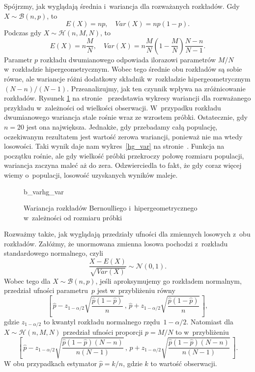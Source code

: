 Spójrzmy, jak wyglądają średnia i~wariancja dla rozważanych rozkładów.
Gdy $X\sim\mathcal{B}(n,p)$, to
\begin{equation}
E(X)=np,\quad Var(X)=np(1-p).
\end{equation}
Podczas gdy $X\sim\mathcal{H}(n,M,N)$, to
\begin{equation}
E(X)=n\frac{M}{N},\quad Var(X)=n\frac{M}{N}\left(1-\frac{M}{N}\right)\frac{N-n}{N-1}.
\end{equation}
Parametr $p$ rozkładu dwumianowego odpowiada ilorazowi parametrów $M/N$ w~rozkładzie hipergeometrycznym. Wobec tego średnie obu rozkładów są sobie równe, ale wariancje różni dodatkowy składnik w~rozkładzie hipergeometrycznym $(N-n)/(N-1)$. Przeanalizujmy, jak ten czynnik wpływa na zróżnicowanie rozkładów. Rysunek \ref{var} na stronie~\pageref{var} przedstawia wykresy wariancji dla rozważanego przykładu w~zależności od wielkości obserwacji. W~przypadku rozkładu dwumianowego wariancja stale rośnie wraz ze wzrostem próbki. Ostatecznie, gdy $n=20$ jest ona największa. Jednakże, gdy przebadamy całą populację, oczekiwanym rezultatem jest wartość zerowa wariancji, ponieważ nie ma wtedy losowości. Taki wynik daje nam wykres~\ref{hg_var} na stronie~\pageref{hg_var}. Funkcja na początku rośnie, ale gdy wielkość próbki przekroczy połowę rozmiaru populacji, wariancja zaczyna maleć aż do zera. Odzwierciedla to fakt, że gdy coraz więcej wiemy o~populacji, losowość uzyskanych wyników maleje.


\begin{figure}[h]
	\begin{subdiagrams}{b_var}{hg_var}
	\end{subdiagrams}

	\caption{Wariancja rozkładów Bernoulliego i~hipergeometrycznego w~zależności od rozmiaru próbki}
	\label{var}
\end{figure}

Rozważmy także, jak wyglądają przedziały ufności dla zmiennych losowych z~obu rozkładów. Załóżmy, że unormowana zmienna losowa pochodzi z~rozkładu standardowego normalnego, czyli
\begin{equation}
\frac{X-E(X)}{\sqrt{Var(X)}}\sim \mathcal{N}(0,1).
\end{equation}
Wobec tego dla $X\sim \mathcal{B}(n,p)$, jeśli aproksymujemy go rozkładem normalnym, przedział ufności parametru~$p$ jest w~przybliżeniu równy
\begin{equation}
\left[\, \hat{p}-z_{1-\alpha/2}\sqrt{\frac{\hat{p}(1-\hat{p})}{n}}\, , \,  \hat{p}+z_{1-\alpha/2}\sqrt{\frac{\hat{p}(1-\hat{p})}{n}}\, \right],
\end{equation}
gdzie $z_{1-\alpha/2}$ to kwantyl rozkładu normalnego rzędu~$1-\alpha/2$.
Natomiast dla $X\sim\mathcal{H}(n,M,N)$ przedział ufności proporcji $p=M/N$ to w~przybliżeniu
\begin{equation}
\left[\, \hat{p}-z_{1-\alpha/2} \sqrt{\frac{\hat{p}(1-\hat{p})(N-n)}{n(N-1)}}\, , \, \hat{p} + z_{1-\alpha/2} \sqrt{\frac{\hat{p}(1-\hat{p})(N-n)}{n(N-1)}}\, \right].
\end{equation}
W obu przypadkach estymator $\hat{p}=k/n$, gdzie $k$ to wartość obserwacji.

